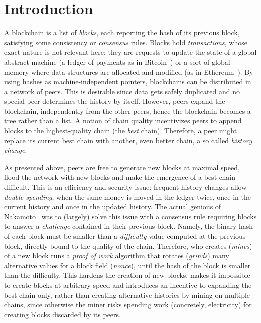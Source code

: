 \section{Introduction}\label{sec:introduction}

A blockchain is a list of \emph{blocks}, each reporting the hash
of its previous block, satisfying some consistency or \emph{consensus} rules.
Blocks hold \emph{transactions}, whose exact nature is not relevant here:
they are requests to update the state of a global abstract machine
(a ledger of payments as in Bitcoin~\cite{Nakamoto08,Antonopoulos17})
or a sort of global memory where data structures are allocated and modified
(as in Ethereum~\cite{AntonopoulosW18}).
By using hashes as machine-independent
pointers, blockchains can be distributed in a network of peers.
This is desirable since data gets safely duplicated
and no special peer determines the history by itself.
However, peers expand the blockchain, independently from the other
peers, hence the blockchain becomes a tree rather than a list.
A notion of chain quality incentivizes peers to append blocks to the highest-quality chain
(the \emph{best} chain).
Therefore, a peer might replace its current best chain with another, even better chain,
a so called \emph{history change}.

As presented above, peers are free to generate new blocks at maximal speed, flood the network
with new blocks and make the emergence of a best chain difficult.
This is an efficiency and security issue: frequent history changes allow
\emph{double spending}, when the same money is moved in the ledger twice, once in the current history
and once in the updated history. The actual genious of Nakamoto~\cite{Nakamoto08} was to
(largely) solve this issue with a consensus rule requiring blocks to answer a \emph{challenge}
contained in their previous block. Namely, the binary hash of each block must be smaller than
a \emph{difficulty} value computed at the previous block, directly bound to the quality of the chain.
Therefore, who creates (\emph{mines}) of a new block runs a \emph{proof of work} algorithm
that rotates (\emph{grinds}) many alternative values for a block field (\emph{nonce}), until
the hash of the block is smaller than the difficulty. This hardens the creation of new blocks,
makes it impossible to create blocks at arbitrary speed and introduces an
incentive to expanding the best chain only,
rather than creating alternative histories by mining on multiple chains,
since otherwise the miner
risks spending work (concretely, electricity) for creating blocks discarded by its peers.

